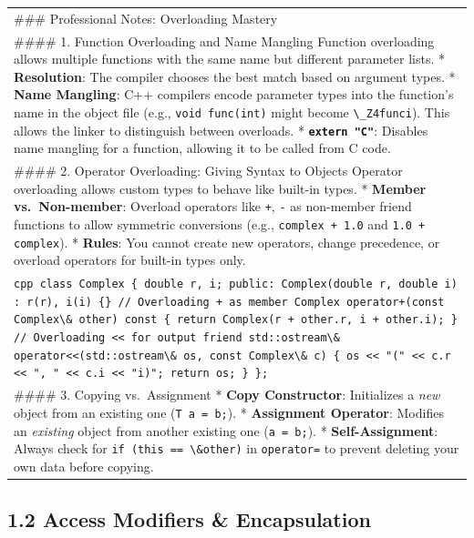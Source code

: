 \begin{longtable}[]{@{}
  >{\raggedright\arraybackslash}p{}@{}}
\toprule
\endhead
\#\#\# Professional Notes: Overloading Mastery \\
\#\#\#\# 1. Function Overloading and Name Mangling Function overloading
allows multiple functions with the same name but different parameter
lists. * \textbf{Resolution}: The compiler chooses the best match based
on argument types. * \textbf{Name Mangling}: C++ compilers encode
parameter types into the function's name in the object file (e.g.,
\passthrough{\lstinline!void func(int)!} might become
\passthrough{\lstinline!\_Z4funci!}). This allows the linker to
distinguish between overloads. *
\textbf{\passthrough{\lstinline!extern "C"!}}: Disables name mangling
for a function, allowing it to be called from C code. \\
\#\#\#\# 2. Operator Overloading: Giving Syntax to Objects Operator
overloading allows custom types to behave like built-in types. *
\textbf{Member vs.~Non-member}: Overload operators like
\passthrough{\lstinline!+!}, \passthrough{\lstinline!-!} as non-member
friend functions to allow symmetric conversions (e.g.,
\passthrough{\lstinline!complex + 1.0!} and
\passthrough{\lstinline!1.0 + complex!}). * \textbf{Rules}: You cannot
create new operators, change precedence, or overload operators for
built-in types only. \\
\passthrough{\lstinline!cpp class Complex \{ double r, i; public: Complex(double r, double i) : r(r), i(i) \{\} // Overloading + as member Complex operator+(const Complex\& other) const \{ return Complex(r + other.r, i + other.i); \} // Overloading << for output friend std::ostream\& operator<<(std::ostream\& os, const Complex\& c) \{ os << "(" << c.r << ", " << c.i << "i)"; return os; \} \};!} \\
\#\#\#\# 3. Copying vs.~Assignment * \textbf{Copy Constructor}:
Initializes a \emph{new} object from an existing one
(\passthrough{\lstinline!T a = b;!}). * \textbf{Assignment Operator}:
Modifies an \emph{existing} object from another existing one
(\passthrough{\lstinline!a = b;!}). * \textbf{Self-Assignment}: Always
check for \passthrough{\lstinline!if (this == \&other)!} in
\passthrough{\lstinline!operator=!} to prevent deleting your own data
before copying. \\
\bottomrule
\end{longtable}

\hypertarget{access-modifiers-encapsulation}{%
\subsection{1.2 Access Modifiers \&
Encapsulation}\label{access-modifiers-encapsulation}}

